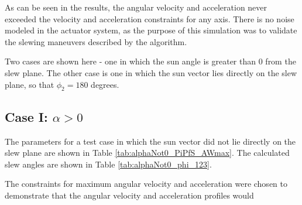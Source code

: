 \documentclass[letterpaper, preprint, paper,11pt]{AAS}	%
\begin{document}
	
	As can be seen in the results, the angular velocity and acceleration never exceeded the velocity and acceleration constraints for any axis. There is no noise modeled in the actuator system, as the purpose of this simulation was to validate the slewing maneuvers described by the algorithm. 
	
	Two cases are shown here - one in which the sun angle is greater than 0 from the slew plane. The other case is one in which the sun vector lies directly on the slew plane, so that $\phi_2 = 180$ degrees. 
		
	\subsection{Case I: $\alpha > 0$} 
		
		The parameters for a test case in which the sun vector did not lie directly on the slew plane are shown in Table \ref{tab:alphaNot0_PiPfS_AWmax}. The calculated slew angles are shown in Table \ref{tab:alphaNot0_phi_123}. 
		
		The constraints for maximum angular velocity and acceleration were chosen to demonstrate that the angular velocity and acceleration profiles would 
		
\end{document}
